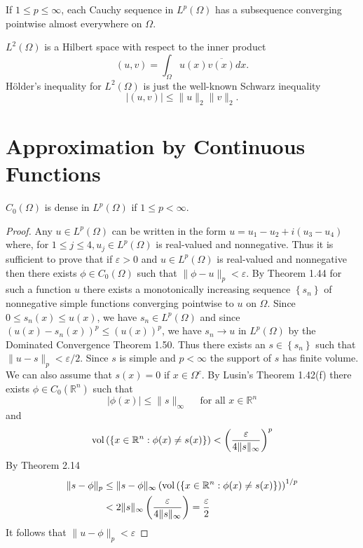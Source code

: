 \begin{corollary}
  If $1 \leq p \leq \infty$, each Cauchy sequence in $L^p(\Omega)$ has a subsequence converging pointwise almost everywhere on $\Omega$.
\end{corollary}


\begin{corollary}
  $L^2(\Omega)$ is a Hilbert space with respect to the inner product
  \[
  (u, v)=\int_{\Omega} u(x) \overline{v(x)} d x .
  \]
  Hölder's inequality for $L^2(\Omega)$ is just the well-known Schwarz inequality
  \[
  |(u, v)| \leq\|u\|_2\|v\|_2 .
  \]
\end{corollary}


\section{Approximation by Continuous Functions}

\begin{theorem}
  $C_0(\Omega)$ is dense in $L^p(\Omega)$ if $1 \leq p<\infty$.
\end{theorem}

\begin{proof}
  Any $u \in L^p(\Omega)$ can be written in the form $u=u_1-u_2+i\left(u_3-u_4\right)$ where, for $1 \leq j \leq 4, u_j \in L^p(\Omega)$ is real-valued and nonnegative. Thus it is sufficient to prove that if $\varepsilon>0$ and $u \in L^p(\Omega)$ is real-valued and nonnegative then there exists $\phi \in C_0(\Omega)$ such that $\|\phi-u\|_p<\varepsilon$. By Theorem 1.44 for such a function $u$ there exists a monotonically increasing sequence $\left\{s_n\right\}$ of nonnegative simple functions converging pointwise to $u$ on $\Omega$. Since $0 \leq s_n(x) \leq u(x)$, we have $s_n \in L^p(\Omega)$ and since $\left(u(x)-s_n(x)\right)^p \leq(u(x))^p$, we have $s_n \rightarrow u$ in $L^p(\Omega)$ by the Dominated Convergence Theorem 1.50. Thus there exists an $s \in\left\{s_n\right\}$ such
  that $\|u-s\|_p<\varepsilon / 2$. Since $s$ is simple and $p<\infty$ the support of $s$ has finite volume. We can also assume that $s(x)=0$ if $x \in \Omega^c$. By Lusin's Theorem 1.42(f) there exists $\phi \in C_0(\mathbb{R}^n)$ such that
  \[
  |\phi(x)| \leq\|s\|_{\infty} \quad \text { for all } x \in \mathbb{R}^n
  \]
  and
  \[
  \operatorname{vol}\left(\left\{x \in \mathbb{R}^n: \phi(x) \neq s(x)\right\}\right)<\left(\frac{\varepsilon}{4\|s\|_{\infty}}\right)^p
  \]
  By Theorem 2.14
  \[
  \begin{aligned}
  \|s-\phi\|_p & \leq\|s-\phi\|_{\infty}\left(\operatorname{vol}\left(\left\{x \in \mathbb{R}^n: \phi(x) \neq s(x)\right\}\right)\right)^{1 / p} \\
  & <2\|s\|_{\infty}\left(\frac{\varepsilon}{4\|s\|_{\infty}}\right)=\frac{\varepsilon}{2}
  \end{aligned}
  \]
  It follows that $\|u-\phi\|_p<\varepsilon$
\end{proof}

